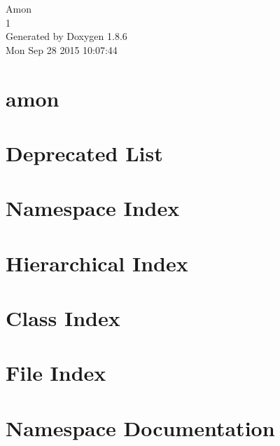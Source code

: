 \documentclass[twoside]{book}
\newcommand{\clearemptydoublepage}{%
  \newpage{\pagestyle{empty}\cleardoublepage}%
}
\begin{document}
\hypersetup{pageanchor=false}
\begin{titlepage}
\vspace*{7cm}
\begin{center}%
{\Large Amon \\[1ex]\large 1 }\\
\vspace*{1cm}
{\large Generated by Doxygen 1.8.6}\\
\vspace*{0.5cm}
{\small Mon Sep 28 2015 10:07:44}\\
\end{center}
\end{titlepage}
\clearemptydoublepage
\tableofcontents
\clearemptydoublepage
{}
\hypersetup{pageanchor=true}

\chapter{amon}
\label{md__r_e_a_d_m_e}
\hypertarget{md__r_e_a_d_m_e}{}

\chapter{Deprecated List}
\label{deprecated}
\hypertarget{deprecated}{}

\chapter{Namespace Index}

\chapter{Hierarchical Index}

\chapter{Class Index}

\chapter{File Index}

\chapter{Namespace Documentation}


\end{document}
